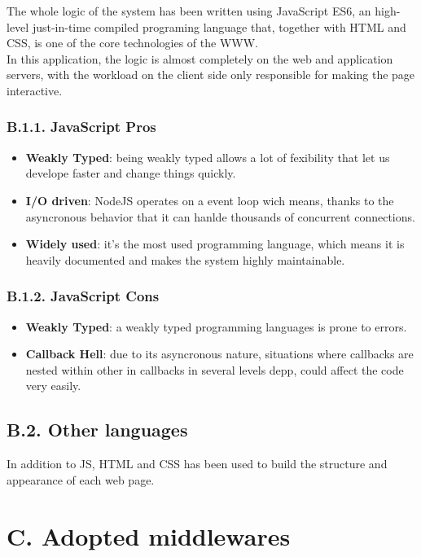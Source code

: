 The whole logic of the system has been written using JavaScript ES6, an high-level just-in-time compiled programing language that, together with HTML and CSS, is one of the core technologies of the WWW.\\
In this application, the logic is almost completely on the web and application servers, with the workload on the client side only responsible for making the page interactive.

\subsubsection{B.1.1. JavaScript Pros}

\begin{itemize}
  \item \textbf{Weakly Typed}: being weakly typed allows a lot of fexibility that let us develope faster and change things quickly.
  \item \textbf{I/O driven}: NodeJS operates on a event loop wich means, thanks to the asyncronous behavior that it can hanlde thousands of concurrent connections.
  \item \textbf{Widely used}: it's the most used programming language, which means it is heavily documented and makes the system highly maintainable.
\end{itemize}

\subsubsection{B.1.2. JavaScript Cons}

\begin{itemize}
  \item \textbf{Weakly Typed}: a weakly typed programming languages is prone to errors.
  \item \textbf{Callback Hell}: due to its asyncronous nature, situations where callbacks are nested within other in callbacks in several levels depp, could affect the code very easily.
\end{itemize}

\subsection{B.2. Other languages}

In addition to JS, HTML and CSS has been used to build the structure and appearance of each web page.

\section{C. Adopted middlewares}

